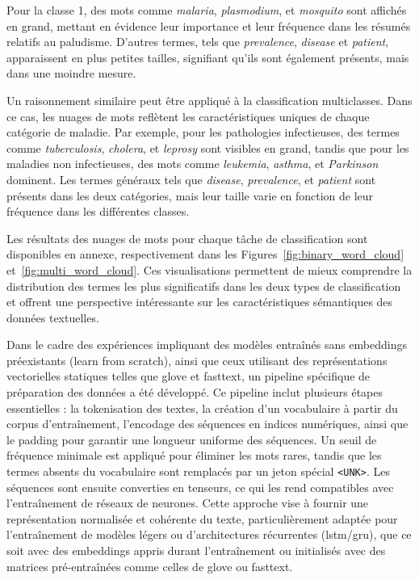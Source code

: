 \documentclass[12pt]{report}
\begin{document}
Pour la classe 1, des mots comme \textit{malaria}, \textit{plasmodium}, et \textit{mosquito} sont affichés en grand, mettant en évidence leur importance et leur fréquence dans les résumés relatifs au paludisme. D'autres termes, tels que \textit{prevalence}, \textit{disease} et \textit{patient}, apparaissent en plus petites tailles, signifiant qu’ils sont également présents, mais dans une moindre mesure.

Un raisonnement similaire peut être appliqué à la classification multiclasses. Dans ce cas, les nuages de mots reflètent les caractéristiques uniques de chaque catégorie de maladie. Par exemple, pour les pathologies infectieuses, des termes comme \textit{tuberculosis}, \textit{cholera}, et \textit{leprosy} sont visibles en grand, tandis que pour les maladies non infectieuses, des mots comme \textit{leukemia}, \textit{asthma}, et \textit{Parkinson} dominent. Les termes généraux tels que \textit{disease}, \textit{prevalence}, et \textit{patient} sont présents dans les deux catégories, mais leur taille varie en fonction de leur fréquence dans les différentes classes.

Les résultats des nuages de mots pour chaque tâche de classification sont disponibles en annexe, respectivement dans les Figures~\ref{fig:binary_word_cloud} et~\ref{fig:multi_word_cloud}. Ces visualisations permettent de mieux comprendre la distribution des termes les plus significatifs dans les deux types de classification et offrent une perspective intéressante sur les caractéristiques sémantiques des données textuelles.

Dans le cadre des expériences impliquant des modèles entraînés sans embeddings préexistants (learn from scratch), ainsi que ceux utilisant des représentations vectorielles statiques telles que \gls{glove} et \gls{fasttext}, un pipeline spécifique de préparation des données a été développé. Ce pipeline inclut plusieurs étapes essentielles : la tokenisation des textes, la création d’un vocabulaire à partir du corpus d'entraînement, l'encodage des séquences en indices numériques, ainsi que le padding pour garantir une longueur uniforme des séquences. Un seuil de fréquence minimale est appliqué pour éliminer les mots rares, tandis que les termes absents du vocabulaire sont remplacés par un jeton spécial \texttt{<UNK>}. Les séquences sont ensuite converties en tenseurs, ce qui les rend compatibles avec l'entraînement de réseaux de neurones. Cette approche vise à fournir une représentation normalisée et cohérente du texte, particulièrement adaptée pour l’entraînement de modèles légers ou d’architectures récurrentes (\gls{lstm}/\gls{gru}), que ce soit avec des embeddings appris durant l’entraînement ou initialisés avec des matrices pré-entraînées comme celles de \gls{glove} ou \gls{fasttext}.
\end{document}
